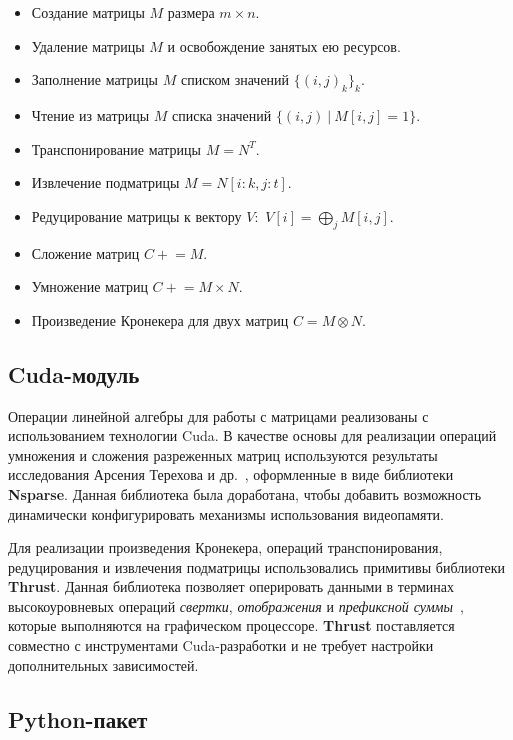 \begin{itemize}[noitemsep,topsep=0pt,parsep=0pt,partopsep=0pt]
    \item Создание матрицы $M$ размера $m \times n$.
    \item Удаление матрицы $M$ и освобождение занятых ею ресурсов.
    \item Заполнение матрицы $M$ списком значений $\{(i, j)_k\}_k$.
    \item Чтение из матрицы $M$ списка значений $\{(i, j)~|~M[i,j]=1\}$.
    \item Транспонирование матрицы $M = N^T$.
    \item Извлечение подматрицы $M = N[i:k, j:t]$.
    \item Редуцирование матрицы к вектору $V$:~$V[i]=\bigoplus_j M[i,j]$.
    \item Сложение матриц $C \mathrel{+}= M$.
    \item Умножение матриц $C \mathrel{+}= M \times N$.
    \item Произведение Кронекера для двух матриц $C = M \otimes N$.
\end{itemize}

\subsection{Cuda-модуль}

Операции линейной алгебры для работы с матрицами реализованы с использованием технологии Cuda. 
В качестве основы для реализации операций умножения и сложения разреженных матриц используются результаты исследования Арсения Терехова и др.~\cite{inproceedings:cfqp_matrix_with_single_source}, оформленные в виде библиотеки \textbf{Nsparse}.
Данная библиотека была доработана, чтобы добавить возможность динамически конфигурировать механизмы использования видеопамяти. 

Для реализации произведения Кронекера, операций транспонирования, редуцирования и извлечения подматрицы использовались примитивы библиотеки \textbf{Thrust}.
Данная библиотека позволяет оперировать данными в терминах высокоуровневых операций \textit{свертки}, \textit{отображения} и \textit{префиксной суммы}~\cite{net:cuda_thrust}, которые выполняются на графическом процессоре. 
\textbf{Thrust} поставляется совместно с инструментами Cuda-разработки и не требует настройки дополнительных зависимостей.

\subsection{Python-пакет}

